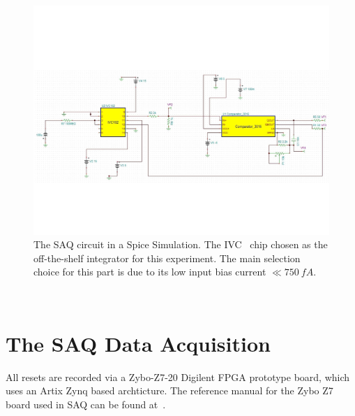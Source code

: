 \begin{figure}[]
\centering
\includegraphics[width=\textwidth]{images/SAQ_spice_circuit.pdf}
\caption{The SAQ circuit in a Spice Simulation.
The IVC~\citep{ivc_datasheet} chip chosen as the off-the-shelf integrator for this experiment.
The main selection choice for this part is due to its low input bias current $\ll 750~\unit{fA}$.}
\end{figure}~\label{fig:saq_circuit_spice}


\section{The SAQ Data Acquisition}

All resets are recorded via a Zybo-Z7-20 Digilent FPGA prototype board, which uses an Artix Zynq based archticture.
The reference manual for the Zybo Z7 board used in SAQ can be found at~\citep{zybo_zy_reference}.

